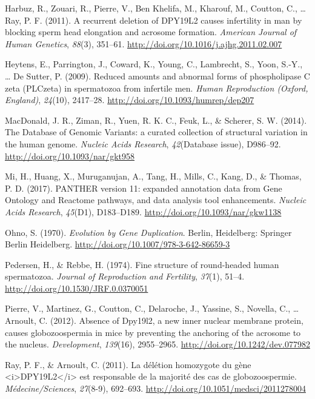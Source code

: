 \documentclass[12pt,twoside]{reedthesis}
\theoremstyle{definition}
\theoremstyle{definition}
\theoremstyle{remark}
\begin{document}
  \hypertarget{ref-Harbuz2011}{}
  Harbuz, R., Zouari, R., Pierre, V., Ben Khelifa, M., Kharouf, M.,
  Coutton, C., \ldots{} Ray, P. F. (2011). A recurrent deletion of DPY19L2
  causes infertility in man by blocking sperm head elongation and acrosome
  formation. \emph{American Journal of Human Genetics}, \emph{88}(3),
  351--61. \url{http://doi.org/10.1016/j.ajhg.2011.02.007}
  
  \hypertarget{ref-Heytens2009}{}
  Heytens, E., Parrington, J., Coward, K., Young, C., Lambrecht, S., Yoon,
  S.-Y., \ldots{} De Sutter, P. (2009). Reduced amounts and abnormal forms
  of phospholipase C zeta (PLCzeta) in spermatozoa from infertile men.
  \emph{Human Reproduction (Oxford, England)}, \emph{24}(10), 2417--28.
  \url{http://doi.org/10.1093/humrep/dep207}
  
  \hypertarget{ref-MacDonald2014}{}
  MacDonald, J. R., Ziman, R., Yuen, R. K. C., Feuk, L., \& Scherer, S. W.
  (2014). The Database of Genomic Variants: a curated collection of
  structural variation in the human genome. \emph{Nucleic Acids Research},
  \emph{42}(Database issue), D986--92.
  \url{http://doi.org/10.1093/nar/gkt958}
  
  \hypertarget{ref-Mi2017}{}
  Mi, H., Huang, X., Muruganujan, A., Tang, H., Mills, C., Kang, D., \&
  Thomas, P. D. (2017). PANTHER version 11: expanded annotation data from
  Gene Ontology and Reactome pathways, and data analysis tool
  enhancements. \emph{Nucleic Acids Research}, \emph{45}(D1), D183--D189.
  \url{http://doi.org/10.1093/nar/gkw1138}
  
  \hypertarget{ref-Ohno1970}{}
  Ohno, S. (1970). \emph{Evolution by Gene Duplication}. Berlin,
  Heidelberg: Springer Berlin Heidelberg.
  \url{http://doi.org/10.1007/978-3-642-86659-3}
  
  \hypertarget{ref-Pedersen1974}{}
  Pedersen, H., \& Rebbe, H. (1974). Fine structure of round-headed human
  spermatozoa. \emph{Journal of Reproduction and Fertility}, \emph{37}(1),
  51--4. \url{http://doi.org/10.1530/JRF.0.0370051}
  
  \hypertarget{ref-Pierre2012}{}
  Pierre, V., Martinez, G., Coutton, C., Delaroche, J., Yassine, S.,
  Novella, C., \ldots{} Arnoult, C. (2012). Absence of Dpy19l2, a new
  inner nuclear membrane protein, causes globozoospermia in mice by
  preventing the anchoring of the acrosome to the nucleus.
  \emph{Development}, \emph{139}(16), 2955--2965.
  \url{http://doi.org/10.1242/dev.077982}
  
  \hypertarget{ref-Ray2011}{}
  Ray, P. F., \& Arnoult, C. (2011). La délétion homozygote du gène
  \textless{}i\textgreater{}DPY19L2\textless{}/i\textgreater{} est
  responsable de la majorité des cas de globozoospermie.
  \emph{Médecine/Sciences}, \emph{27}(8-9), 692--693.
  \url{http://doi.org/10.1051/medsci/2011278004}
  
\end{document}
